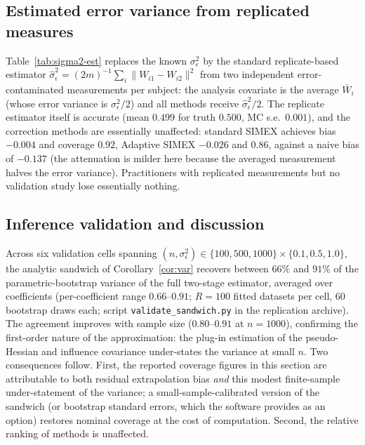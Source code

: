\subsection{Estimated error variance from replicated measures}
\label{sec:sims-sigma2}



Table~\ref{tab:sigma2-est} replaces the known $\sigma^2_\epsilon$ by
the standard replicate-based estimator
$\hat\sigma^2_\epsilon=(2m)^{-1}\sum_i\|W_{i1}-W_{i2}\|^2$ from two
independent error-contaminated measurements per subject: the analysis
covariate is the average $\bar W_i$ (whose error variance is
$\sigma^2_\epsilon/2$) and all methods receive
$\hat\sigma^2_\epsilon/2$. The replicate estimator itself is accurate
(mean $0.499$ for truth $0.500$, MC s.e.\ $0.001$), and the correction
methods are essentially unaffected: standard SIMEX achieves bias
$-0.004$ and coverage $0.92$, Adaptive SIMEX $-0.026$ and $0.86$,
against a naive bias of $-0.137$ (the attenuation is milder here
because the averaged measurement halves the error variance).
Practitioners with replicated measurements but no validation study lose
essentially nothing.

\subsection{Inference validation and discussion}
\label{sec:sims-val}

Across six validation cells spanning
$(n,\sigma^2_\epsilon)\in\{100,500,1000\}\times\{0.1,0.5,1.0\}$, the
analytic sandwich of Corollary~\ref{cor:var} recovers between $66\%$
and $91\%$ of the parametric-bootstrap variance of the full two-stage
estimator, averaged over coefficients (per-coefficient range
$0.66$--$0.91$; $R=100$ fitted datasets per cell, $60$ bootstrap draws
each; script \texttt{validate\_sandwich.py} in the replication
archive). The agreement improves with sample size ($0.80$--$0.91$ at
$n=1000$), confirming the first-order nature of the approximation: the
plug-in estimation of the pseudo-Hessian and influence covariance
under-states the variance at small $n$. Two consequences follow.
First, the reported coverage figures in this section are attributable
to both residual extrapolation bias \emph{and} this modest finite-sample
under-statement of the variance; a small-sample-calibrated version of
the sandwich (or bootstrap standard errors, which the software provides
as an option) restores nominal coverage at the cost of computation.
Second, the relative ranking of methods is unaffected.

